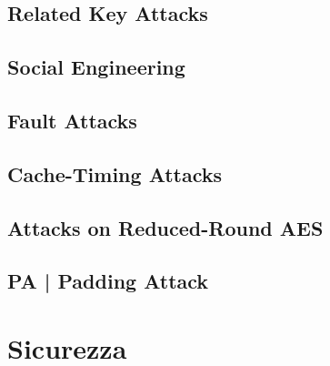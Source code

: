 \textsf{\small }

\subsection{Related Key Attacks}

\textsf{\small }

\subsection{Social Engineering}

\textsf{\small }

\subsection{Fault Attacks}

\textsf{\small }

\subsection{Cache-Timing Attacks}

\textsf{\small }

\subsection{Attacks on Reduced-Round AES}

\textsf{\small }

\subsection{PA | Padding Attack}

\textsf{\small }


\section{Sicurezza}

\textsf{\small }


